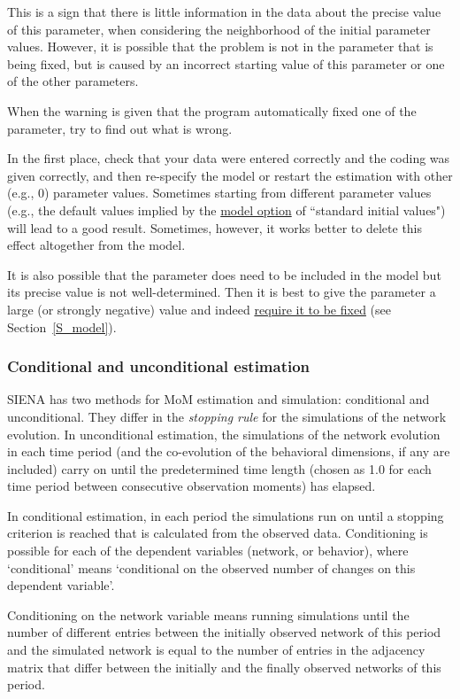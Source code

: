 \documentclass[a4paper,fleqn]{article}
\newcommand{\+}{\, + \,}
\newcommand{\SI}{{\sf SIENA }}
\begin{document}
{This is a sign that there is little information in the data about
the precise value of this parameter, when considering the
neighborhood of the initial parameter values. However, it is
possible that the problem is not in the parameter that is being
fixed, but is caused by an incorrect starting value of this
parameter or one of the other parameters.

When the warning is given that the program automatically fixed one
of the parameter, try to find out what is wrong.

In the first place, check that your data were entered correctly
and the coding was given correctly, and then re-specify the model
or restart the estimation with other (e.g., 0) parameter values.
Sometimes starting from different parameter values (e.g., the
default values implied by the
\hyperlink{T_S_options}{model option}
of ``standard initial values") will lead to a good result.
Sometimes, however, it works better to delete this effect
altogether from the model.

It is also possible that the parameter does need to be included in
the model but its precise value is not well-determined. Then it is
best to give the parameter a large (or strongly negative) value
and indeed
\hyperlink{T_fix}{require it to be fixed}
(see Section~\ref{S_model}).


\subsubsection{Conditional and unconditional estimation}
\label{S_cond}

\SI has two methods for MoM estimation and simulation:
\hypertarget{T_S_cond}{conditional and unconditional}. They differ
in the {\em stopping rule} for the simulations of the network
evolution. In unconditional estimation, the simulations of the
network evolution in each time period (and the co-evolution of the
behavioral dimensions, if any are included) carry on until the
predetermined time length (chosen as 1.0
for each time period between consecutive observation moments) has elapsed.

In conditional estimation, in each period
the simulations run on until a stopping
criterion is reached that is calculated from the observed data.
Conditioning is possible for each of the dependent variables
(network, or behavior), where `conditional' means `conditional on
the observed number of changes on this dependent variable'.

Conditioning on the network variable means running simulations
until the number of different entries between the initially
observed network of this period and the simulated network
\hypertarget{T_distance_stop}{is equal to the number} of entries
in the adjacency matrix that differ between the initially and the
finally observed networks of this period.

}
\end{document}
